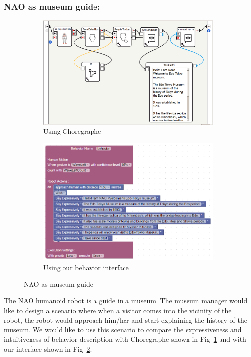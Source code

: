 \subsubsection{NAO as museum guide: }
\begin{figure}
\centering
\begin{subfigure}[t]{0.49\textwidth}
\includegraphics[width=\textwidth]{../thesis/assets/scenario_museum_choregraphe2.png}
\caption[Using Choregraphe]{Using Choregraphe}
\label{fig:scenario1_program_choregraphe}
\end{subfigure}
\begin{subfigure}[t]{0.49\textwidth}
\includegraphics[width=\textwidth]{../thesis/assets/scenario1.png}
\caption[Using our behavior interface]{Using our behavior interface}
\label{fig:scenario1_program}
\end{subfigure}
\caption[NAO as museum guide]{NAO as museum guide}
\label{fig:scenarios}
\end{figure}
	The NAO humanoid robot is a guide in a museum. The museum manager would like to design a scenario where when a visitor comes into the vicinity of the robot, the robot would approach him/her and start explaining the history of the museum. We would like to use this scenario to compare the expressiveness and intuitiveness of behavior description with Choregraphe \cite{NaoRobot} shown in Fig~\ref{fig:scenario1_program_choregraphe} and with our interface shown in Fig~\ref{fig:scenario1_program}.
	
